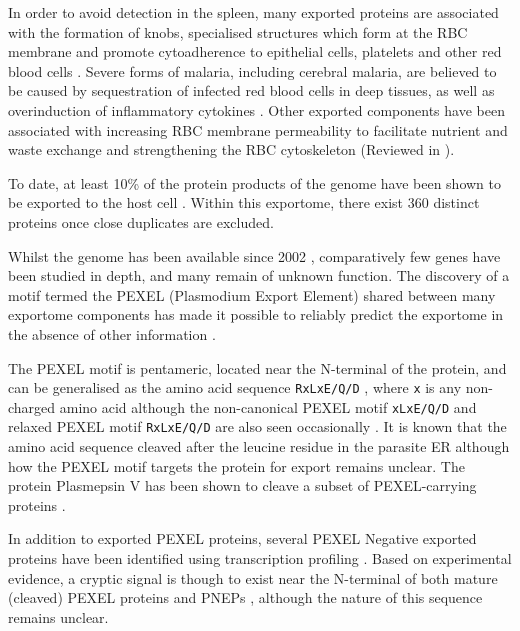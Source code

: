 \documentclass[fleqn,10pt]{article} %
\begin{document}
In order to avoid detection in the spleen, many exported proteins are associated with the formation of knobs, specialised structures which form at the RBC membrane and promote cytoadherence to epithelial cells, platelets and other red blood cells \cite{Kraemer2006}. Severe forms of malaria, including cerebral malaria, are believed to be caused by sequestration of infected red blood cells in deep tissues, as well as overinduction of inflammatory cytokines \cite{Chen2000}. Other exported components have been associated with increasing RBC membrane permeability to facilitate nutrient and waste exchange and strengthening the RBC cytoskeleton (Reviewed in \cite{Elsworth2014}). 

To date, at least 10\% of the protein products of the \pf genome have been shown to be exported to the host cell \cite{Boddey2013a}. Within this exportome, there exist 360 distinct proteins once close duplicates are excluded.

Whilst the \pf genome has been available since 2002 \cite{Gardner2002}, comparatively few genes have been studied in depth, and many remain of unknown function. The discovery of a motif termed the PEXEL (Plasmodium Export Element) shared between many exportome components has made it possible to reliably predict the \pf exportome in the absence of other information \cite{Sargeant2006}.

The PEXEL motif is pentameric, located near the N-terminal of the protein, and can be generalised as the amino acid sequence \texttt{RxLxE/Q/D} \cite{Goldberg2010}, where \texttt{x} is any non-charged amino acid \cite{Dietz2014} although the non-canonical PEXEL motif \texttt{xLxE/Q/D} and relaxed PEXEL motif \texttt{RxLxE/Q/D} are also seen occasionally \cite{Elsworth2014}. It is known that the amino acid sequence cleaved after the leucine residue in the parasite ER \cite{Goldberg2010} although how the PEXEL motif targets the protein for export remains unclear. The \pf protein Plasmepsin V has been shown to cleave a subset of PEXEL-carrying proteins \cite{Boddey2013}.


In addition to exported PEXEL proteins, several PEXEL Negative exported proteins have been identified using transcription profiling \cite{Heiber2013}. Based on experimental evidence, a cryptic signal is though to exist near the N-terminal of both mature (cleaved) PEXEL proteins and PNEPs \cite{Gruring2012}, although the nature of this sequence remains unclear.
\end{document}
